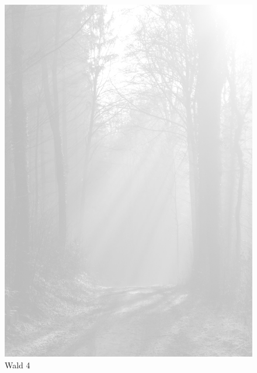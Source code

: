 \documentclass[ngerman,a4paper,11pt]{scrreprt}
\begin{document}
\begin{figure}[H]
\centering
\includegraphics[width=\textwidth,height=.8\textheight,keepaspectratio]{Bilder/Bilder/750_0010_23639_1256619_Wald.png}
\caption{\label{img_Wald_4}Wald 4}
\end{figure}
\end{document}
